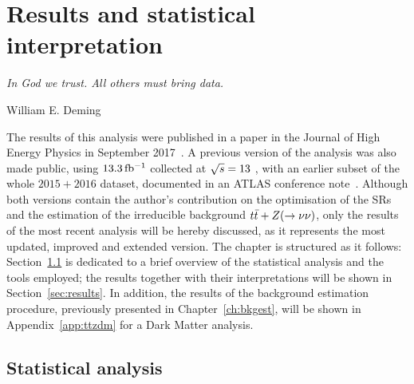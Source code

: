 \chapter{Results and statistical interpretation}
\label{ch:results}
\epigraph{\emph{In God we trust. All others must bring data.}}{William E. Deming}

	The results of this analysis were published in a paper in the Journal of High Energy Physics in September 2017~\cite{stop0L}. A previous version of the analysis was also made public, using $13.3\,\mbox{fb$^{-1}$}$ collected at $\sqrt{s} = 13$ \TeV, with an earlier subset of the whole $2015+2016$ dataset, documented in an ATLAS conference note~\cite{ICHEPstop0L}. Although both versions contain the author's contribution on the optimisation of the \acp{SR} and the estimation of the irreducible background $t\bar{t}+Z (\rightarrow \nu\nu)$, only the results of the most recent analysis will be hereby discussed, as it represents the most updated, improved and extended version. The chapter is structured as it follows: Section~\ref{sec:stat_ana} is dedicated to a brief overview of the statistical analysis and the tools employed; the results together with their interpretations will be shown in Section~\ref{sec:results}. In addition, the results of the background estimation procedure, previously presented in Chapter~\ref{ch:bkgest}, will be shown in Appendix~\ref{app:ttzdm} for a Dark Matter analysis. %


	\section{Statistical analysis}
	\label{sec:stat_ana}

